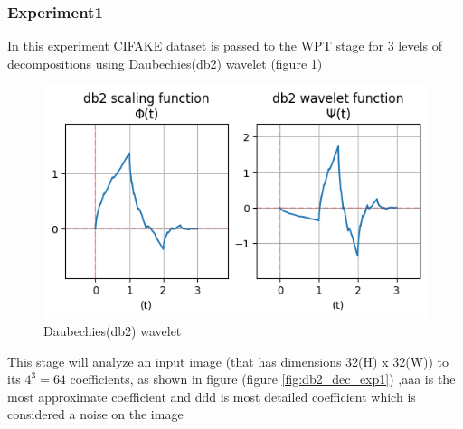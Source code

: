 \documentclass{svproc}
\begin{document}
\subsubsection{Experiment1}
In this experiment CIFAKE dataset is passed to the WPT stage for 3 levels of decompositions using Daubechies(db2) wavelet (figure \ref{fig:db2})

\begin{figure}[H]
  \centering
    \includegraphics[width=0.5\linewidth]{figures/wavelet_db2.png}
    \caption{Daubechies(db2) wavelet}
    \label{fig:db2}
\end{figure}

\noindent
This stage will analyze an input image (that has dimensions 32(H) x 32(W)) to its $4^3 = 64$ coefficients, as shown in figure (figure \ref{fig:db2_dec_exp1}) ,aaa is the most approximate coefficient and ddd is most detailed coefficient which is considered a noise on the image 
\end{document}
